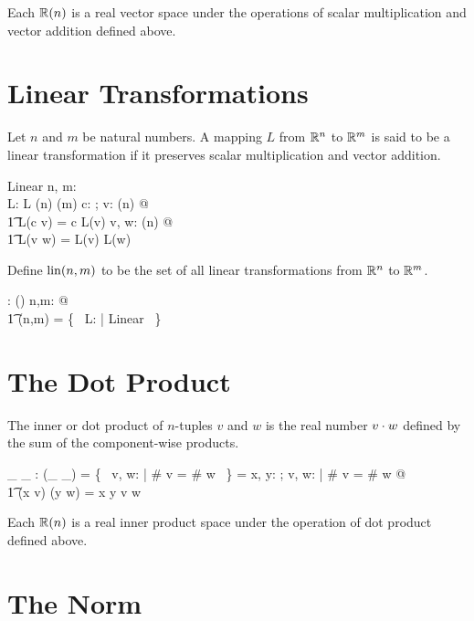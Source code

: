 \documentclass[11pt, oneside]{article}
\begin{document}
Each $\mathbb{R}(n)$ is a real vector space under the operations of scalar multiplication and vector addition
defined above. 

\section{Linear Transformations}

Let $n$ and $m$ be natural numbers.
A mapping $L$ from $\mathbb{R}^n$ to $\mathbb{R}^m$ is said to be a linear transformation if it preserves scalar multiplication and vector addition.
\begin{schema}{Linear}
	n, m: \nat \\
	L: \Rinf \pfun \Rinf
\where
	L \in \Rtuples(n) \fun \Rtuples(m)
\also
	\forall c: \R; v: \Rtuples(n) @ \\
	\t1	L(c \smulR v) = c \smulR L(v)
\also
	\forall v, w: \Rtuples(n) @ \\
	\t1	L(v \vaddR w) = L(v) \vaddR L(w)
\end{schema}

Define $\operatorname{lin}(n,m)$ to be the set of all linear transformations from $\mathbb{R}^n$ to $\mathbb{R}^m$.
\begin{axdef}
	\linR: \nat \cross \nat \fun \power(\Rinf \pfun \Rinf)
\where
	\forall n,m: \nat @ \\
	\t1	\linR(n,m) = \{~ L: \Rinf \pfun \Rinf | Linear ~\}
\end{axdef}

\section{The Dot Product}

The inner or dot product of $n$-tuples $v$ and $w$ is the real number $v \mathbin{\cdot} w$ defined by the sum of the component-wise products.

\begin{axdef}
	\_ \dotR \_ : \Rinf \cross \Rinf \pfun \R
\where
	\dom(\_ \dotR \_) = \{~ v, w: \Rinf | \# v = \# w ~\}
\also
	\langle \rangle \dotR \langle \rangle = \zeroR
\also
	\forall x, y: \R; v, w: \Rinf | \# v = \# w @ \\
	\t1	(\langle x \rangle \cat v) \dotR (\langle y \rangle \cat w) = x \mulR y \addR v \dotR w
\end{axdef}

Each $\mathbb{R}(n)$ is a real inner product space under the operation of dot product defined above.

\section{The Norm}
\end{document}
